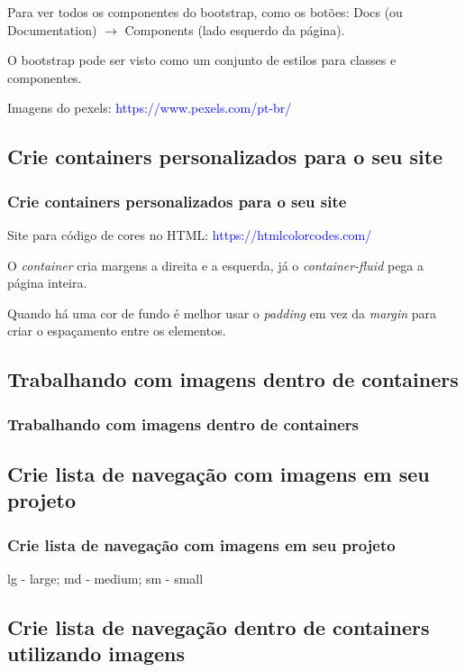 \documentclass[12pt,a4paper]{article}
\begin{document}
	Para ver todos os componentes do bootstrap, como os botões: Docs (ou Documentation) $\rightarrow$ Components (lado esquerdo da página).
	
	O bootstrap pode ser visto como um conjunto de estilos para classes e componentes.
	
	Imagens do pexels: \textcolor{blue}{https://www.pexels.com/pt-br/}
	
	\subsection{Crie containers personalizados para o seu site}
	\subsubsection{Crie containers personalizados para o seu site}
	
	Site para código de cores no HTML: \textcolor{blue}{https://htmlcolorcodes.com/}
	
	O \textit{container} cria margens a direita e a esquerda, já o \textit{container-fluid} pega a página inteira. 
	
	Quando há uma cor de fundo é melhor usar o \textit{padding} em vez da \textit{margin} para criar o espaçamento entre os elementos.
	
	\subsection{Trabalhando com imagens dentro de containers}
	\subsubsection{Trabalhando com imagens dentro de containers}
	
	
	\subsection{Crie lista de navegação com imagens em seu projeto}
	\subsubsection{Crie lista de navegação com imagens em seu projeto}
	
	lg - large; md - medium; sm - small
	
	\subsection{Crie lista de navegação dentro de containers utilizando imagens}
\end{document}

